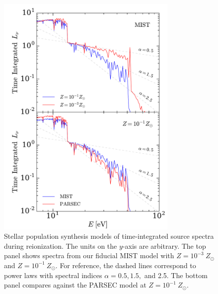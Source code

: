 \documentclass[twocolumn]{aastex62}
\begin{document}
\begin{figure}
\includegraphics[width=8.7cm]{fig5.pdf}
\caption{Stellar population synthesis models of time-integrated source spectra during reionization.  The units on the $y$-axis are arbitrary. The top panel shows spectra from our fiducial MIST model with $Z=10^{-3}~Z_{\odot}$ and $Z=10^{-1}~Z_{\odot}$.  For reference, the dashed lines correspond to power laws with spectral indices $\alpha = 0.5, 1.5,$ and 2.5.  The bottom panel compares against the PARSEC model at $Z=10^{-1}~Z_{\odot}$.} 
\label{FIG:spectra}
\end{figure}
\end{document}
